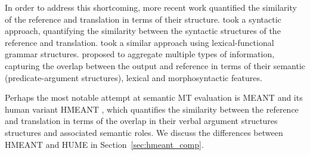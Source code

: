 \documentclass[11pt]{article}
\newcommand{\secref}[1]{Section~\ref{#1}}
\def\parcite#1{\cite{#1}}
\begin{document}
In order to address this shortcoming, more recent work quantified
the similarity of the reference and translation in terms
of their structure.  took a syntactic approach, 
quantifying the similarity between the syntactic structures of the reference and translation.
 took a similar approach using lexical-functional grammar structures.
 proposed to aggregate multiple types of information,
capturing the overlap between the output and reference in terms of their
semantic (predicate-argument structures), lexical and morphosyntactic features.

Perhaps the most notable attempt at semantic MT evaluation is MEANT and
its human variant HMEANT \parcite{lo2011structured}, which quantifies the similarity between
the reference and translation in terms of the overlap in
their verbal argument structures structures and associated semantic roles.
We discuss the differences between HMEANT and HUME in \secref{sec:hmeant_comp}.

%
\end{document}
